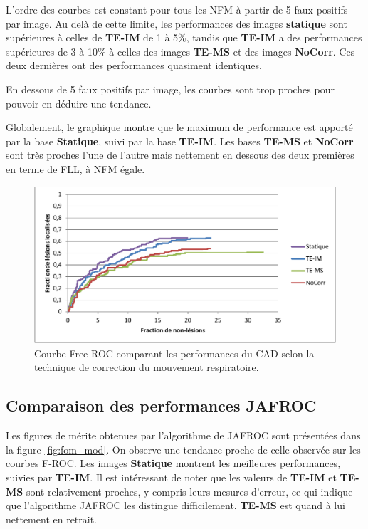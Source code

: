 L'ordre des courbes est constant pour tous les NFM à partir de 5 faux positifs par image. Au delà de cette limite, les performances des images \textbf{statique} sont supérieures à celles de \textbf{TE-IM} de 1 à 5\%, tandis que \textbf{TE-IM} a des performances supérieures de 3 à 10\% à celles des images \textbf{TE-MS} et des images \textbf{NoCorr}. Ces deux dernières ont des performances quasiment identiques.

En dessous de 5 faux positifs par image, les courbes sont trop proches pour pouvoir en déduire une tendance.


Globalement, le graphique montre que le maximum de performance est apporté par la base \textbf{Statique}, suivi par la base \textbf{TE-IM}. Les bases \textbf{TE-MS} et \textbf{NoCorr} sont très proches l'une de l'autre mais nettement en dessous des deux premières en terme de FLL, à NFM égale.

\begin{figure}[h!]
 \begin{center}
   \includegraphics[width=13cm]{images/FROC_mod}
 \end{center}
 \caption{Courbe Free-ROC comparant les performances du CAD selon la technique de correction du mouvement respiratoire.}
 \label{fig:froc_mod}
\end{figure}


\subsection{Comparaison des performances JAFROC}

Les figures de mérite obtenues par l'algorithme de JAFROC sont présentées dans la figure \ref{fig:fom_mod}. On observe une tendance proche de celle observée sur les courbes F-ROC. Les images \textbf{Statique} montrent les meilleures performances, suivies par \textbf{TE-IM}. Il est intéressant de noter que les valeurs de \textbf{TE-IM} et \textbf{TE-MS} sont relativement proches, y compris leurs mesures d'erreur, ce qui indique que l'algorithme JAFROC les distingue difficilement. \textbf{TE-MS} est quand à lui nettement en retrait. 

